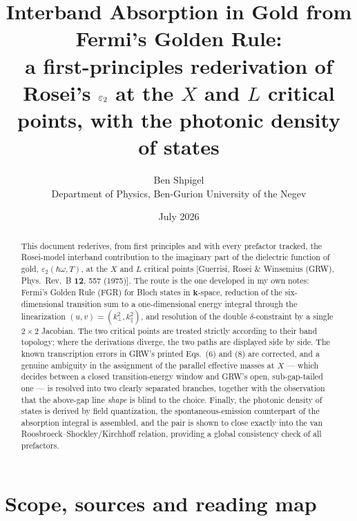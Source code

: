 \documentclass[11pt,a4paper]{article}
\title{\bfseries Interband Absorption in Gold from Fermi's Golden Rule:\\
a first-principles rederivation of Rosei's $\eps_2$ at the $X$ and $L$
critical points, with the photonic density of states}
\author{Ben Shpigel\\ \small Department of Physics, Ben-Gurion University of the Negev}
\date{July 2026}
\numberwithin{equation}{section}
\newcommand{\hw}{\hbar\omega}
\newcommand{\kperp}{k_{\perp}}
\newcommand{\kpar}{k_{\parallel}}
\newcommand{\eps}{\varepsilon}
\begin{document}
\maketitle

\begin{abstract}
\noindent
This document rederives, from first principles and with every prefactor
tracked, the Rosei-model interband contribution to the imaginary part of
the dielectric function of gold, $\eps_2(\hw,T)$, at the $X$ and $L$
critical points [Guerrisi, Rosei \& Winsemius (GRW), Phys.\ Rev.\ B
\textbf{12}, 557 (1975)].  The route is the one developed in my own
notes: Fermi's Golden Rule (FGR) for Bloch states in $\mathbf{k}$-space,
reduction of the six-dimensional transition sum to a one-dimensional
energy integral through the linearization $(u,v)=(\kperp^2,\kpar^2)$,
and resolution of the double $\delta$-constraint by a single
$2\times2$ Jacobian.  The two critical points are treated strictly
according to their band topology; where the derivations diverge, the
two paths are displayed side by side.  The known transcription errors
in GRW's printed Eqs.~(6) and (8) are corrected, and a genuine
ambiguity in the assignment of the parallel effective masses at $X$
--- which decides between a closed transition-energy window and GRW's
open, sub-gap-tailed one --- is resolved into two clearly separated
branches, together with the observation that the above-gap line
\emph{shape} is blind to the choice.  Finally, the photonic density of
states is derived by field quantization, the spontaneous-emission
counterpart of the absorption integral is assembled, and the pair is
shown to close exactly into the van Roosbroeck--Shockley/Kirchhoff
relation, providing a global consistency check of all prefactors.
\end{abstract}

\tableofcontents

\section{Scope, sources and reading map}
\end{document}
